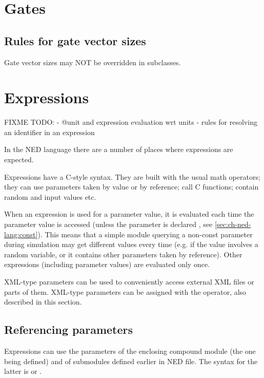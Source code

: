 \section{Gates}

\subsection{Rules for gate vector sizes}

Gate vector sizes may NOT be overridden in subclasses.



\section{Expressions}
\label{ch-ned-ref:sec:expressions}

FIXME TODO:
- @unit and expression evaluation wrt units
- rules for resolving an identifier in an expression

In the NED language there are a number of places where
expressions are expected.

Expressions have a C-style syntax. They are built with the usual math
operators; they can use parameters taken by
value or by reference; call C functions; contain random and input
values etc.

When an expression is used for a parameter value, it is evaluated
each time the parameter value is accessed (unless the parameter is
declared , see \ref{sec:ch-ned-lang:const}). This means
that a simple module querying a non-const parameter during simulation
may get different values every time (e.g. if the value involves a
random variable, or it contains other parameters taken by reference).
Other expressions (including  parameter values)
are evaluated only once.

XML-type parameters can be used to conveniently access external
XML files or parts of them. XML-type parameters can be assigned
with the  operator, also described in this section.


\subsection{Referencing parameters}

Expressions can use the parameters of the enclosing compound module
(the one being defined) and of submodules defined earlier in NED file.
The syntax for the latter is  or .

